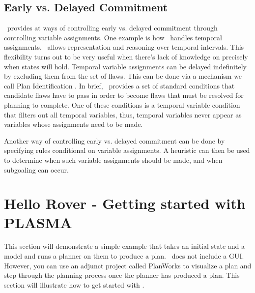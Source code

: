 \documentclass[10pt, letterpaper, twoside]{article}
\begin{document}
{\subsection{Early vs. Delayed Commitment}
\ET\, provides at ways of controlling early vs. delayed commitment through
controlling variable assignments.  One example is how \ET\, handles
temporal assignments.  \ET\, allows representation and reasoning over
temporal intervals.  This flexibility turns out to be very useful when
there's lack of knowledge on precisely when states will hold.  Temporal
variable assignments can be delayed indefinitely by excluding them from the
set of flaws.  This can be done via a mechanism we call Plan
Identification \cite{planid}.  In brief, \ET\, provides a set of standard
conditions that candidate flaws have to pass in order to become flaws that
must be resolved for planning to complete.  One of these conditions is a
temporal variable condition that filters out all temporal variables, thus,
temporal variables never appear as variables whose assignments need to be
made. 

Another way of controlling early vs. delayed commitment can be done by
specifying rules conditional on variable assignments.  A heuristic can then
be used to determine when such variable assignments should be made, and
when subgoaling can occur.

\section{Hello Rover - Getting started with PLASMA}

This section will demonstrate a simple example that takes an initial state
and a model and runs a planner on them to produce a plan.  \ET\, does not
include a GUI.  However, you can use an adjunct project called PlanWorks to
visualize a plan and step through the planning process once the planner has
produced a plan.  This section will illustrate how to get started with \ET.

}
\end{document}
